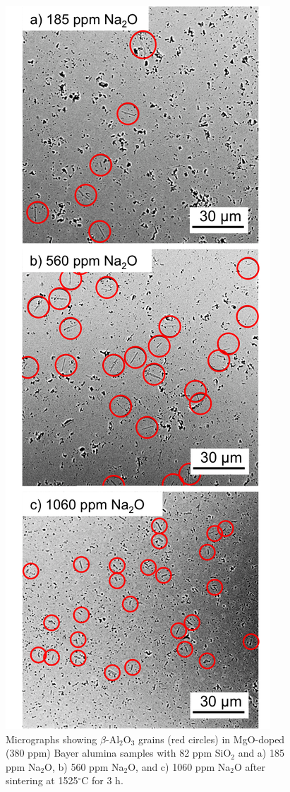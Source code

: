\newpage
\begin{figure}[H]
	\centering
	\includegraphics[scale=0.84]{Chapter-5/Figures/Figure6.png}
	\caption{Micrographs showing $\beta$-Al$_{2}$O$_{3}$ grains (red circles) in MgO-doped (380 ppm) Bayer alumina samples with 82 ppm SiO$_{2}$ and a) 185 ppm Na$_{2}$O, b) 560 ppm Na$_{2}$O, and c) 1060 ppm Na$_{2}$O after sintering at 1525$^{\circ}$C for 3 h.}
	\label{Ch5-figure:Figure6}
\end{figure}

